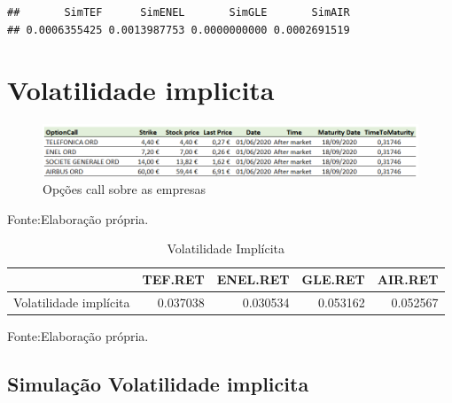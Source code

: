 \documentclass[
  12pt,
  a4paper,
  openany]{book}
\newenvironment{Shaded}{\begin{snugshade}}{\end{snugshade}}
\newcommand{\DecValTok}[1]{\textcolor[rgb]{0.00,0.00,0.81}{#1}}
\newcommand{\NormalTok}[1]{#1}
\newcommand{\OperatorTok}[1]{\textcolor[rgb]{0.81,0.36,0.00}{\textbf{#1}}}
\newcommand{\StringTok}[1]{\textcolor[rgb]{0.31,0.60,0.02}{#1}}
\begin{document}
\begin{verbatim}
##       SimTEF      SimENEL       SimGLE       SimAIR 
## 0.0006355425 0.0013987753 0.0000000000 0.0002691519
\end{verbatim}

\begin{Shaded}
\end{Shaded}

\normalsize

\hypertarget{volatilidade-implicita}{%
\section{Volatilidade implicita}\label{volatilidade-implicita}}

\begin{figure}

{\centering \includegraphics[width=1\linewidth]{image/opcao} 

}

\caption{Opções call sobre as empresas }\label{fig:opcao}
\end{figure}
\FloatBarrier
\centering

Fonte:Elaboração própria.

\justifying
\bigskip

\begin{table}[!h]

\caption{\label{tab:unnamed-chunk-55}Volatilidade Implícita}
\centering
\begin{tabular}[t]{lrrrr}
\toprule
  & TEF.RET & ENEL.RET & GLE.RET & AIR.RET\\
\midrule
Volatilidade implícita & 0.037038 & 0.030534 & 0.053162 & 0.052567\\
\bottomrule
\end{tabular}
\end{table}
\FloatBarrier
\centering

Fonte:Elaboração própria.

\justifying
\bigskip

\hypertarget{simulauxe7uxe3o-volatilidade-implicita}{%
\subsection{Simulação Volatilidade implicita}\label{simulauxe7uxe3o-volatilidade-implicita}}
\end{document}
